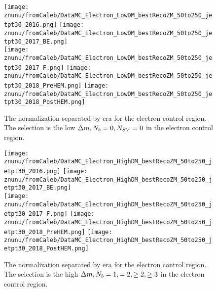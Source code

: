 \begin{figure}[!h]
	\begin{center}
    \texttt{[image: znunu/fromCaleb/DataMC\_Electron\_LowDM\_bestRecoZM\_50to250\_jetpt30\_2016.png]}
    \texttt{[image: znunu/fromCaleb/DataMC\_Electron\_LowDM\_bestRecoZM\_50to250\_jetpt30\_2017\_BE.png]} \\
    \texttt{[image: znunu/fromCaleb/DataMC\_Electron\_LowDM\_bestRecoZM\_50to250\_jetpt30\_2017\_F.png]}
    \texttt{[image: znunu/fromCaleb/DataMC\_Electron\_LowDM\_bestRecoZM\_50to250\_jetpt30\_2018\_PreHEM.png]}
    \texttt{[image: znunu/fromCaleb/DataMC\_Electron\_LowDM\_bestRecoZM\_50to250\_jetpt30\_2018\_PostHEM.png]}
	\end{center}
	\caption[\Znunu{} Normalization in low \dm{} for electronss]{The \Znunu{} normalization separated by era for the electron control region. The selection is the low $\Delta m, N_{b}=0, N_{SV}=0$ in the electron control region.
	 }
	\label{fig:znunu-norm-lm-electron}
\end{figure}

\begin{figure}[!h]
	\begin{center}
    \texttt{[image: znunu/fromCaleb/DataMC\_Electron\_HighDM\_bestRecoZM\_50to250\_jetpt30\_2016.png]}
    \texttt{[image: znunu/fromCaleb/DataMC\_Electron\_HighDM\_bestRecoZM\_50to250\_jetpt30\_2017\_BE.png]} \\
    \texttt{[image: znunu/fromCaleb/DataMC\_Electron\_HighDM\_bestRecoZM\_50to250\_jetpt30\_2017\_F.png]}
    \texttt{[image: znunu/fromCaleb/DataMC\_Electron\_HighDM\_bestRecoZM\_50to250\_jetpt30\_2018\_PreHEM.png]}
    \texttt{[image: znunu/fromCaleb/DataMC\_Electron\_HighDM\_bestRecoZM\_50to250\_jetpt30\_2018\_PostHEM.png]}
	\end{center}
	\caption[\Znunu{} Normalization in high \dm{} for electrons]{The \Znunu{} normalization separated by era for the electron control region. The selection is the high $\Delta m, N_{b}=1, =2, \geq2,\geq3$ in the electron control region.
	 }
	\label{fig:znunu-norm-hm-electron}
\end{figure}

